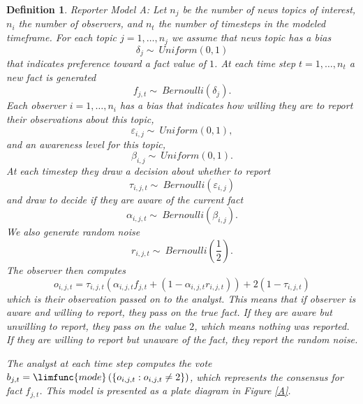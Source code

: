 \documentclass{amsart}
\theoremstyle{plain}
\newtheorem{definition}{Definition}
\numberwithin{equation}{section}
\begin{document}
\begin{definition}
Reporter Model A: Let $n_{j}$ be the number of news topics of interest, $%
n_{i}$ the number of observers, and $n_{t}$ the number of timesteps in the
modeled timeframe. For each topic $j=1,\dots ,n_{j}$ we assume that news
topic has a bias 
\begin{equation*}
\delta _{j}\sim ~Uniform\left( 0,1\right)
\end{equation*}%
that indicates preference toward a fact value of $1$. At each time step $%
t=1,\dots ,n_{t}$ a new fact is generated%
\begin{equation*}
f_{j,t}\sim ~Bernoulli\left( \delta _{j}\right) .
\end{equation*}%
Each observer $i=1,\dots ,n_{i}$ has a bias that indicates how willing they
are to report their observations about this topic,%
\begin{equation*}
\varepsilon _{i,j}\sim ~Uniform\left( 0,1\right) ,
\end{equation*}%
and an awareness level for this topic,%
\begin{equation*}
\beta _{i,j}\sim ~Uniform\left( 0,1\right) .
\end{equation*}%
At each timestep they draw a decision about whether to report%
\begin{equation*}
\tau _{i,j,t}\sim ~Bernoulli\left( \varepsilon _{i,j}\right)
\end{equation*}%
and draw to decide if they are aware of the current fact%
\begin{equation*}
\alpha _{i,j,t}\sim ~Bernoulli\left( \beta _{i,j}\right) .
\end{equation*}%
We also generate random noise 
\begin{equation*}
r_{i,j,t}\sim ~Bernoulli\left( \frac{1}{2}\right) .
\end{equation*}%
The observer then computes%
\begin{equation*}
o_{i,j,t}=\tau _{i,j,t}\left( \alpha _{i,j,t}f_{j,t}+\left( 1-\alpha
_{i,j,t}r_{i,j,t}\right) \right) +2\left( 1-\tau _{i,j,t}\right)
\end{equation*}%
which is their observation passed on to the analyst. This means that if
observer is aware and willing to report, they pass on the true fact. If they
are aware but unwilling to report, they pass on the value $2$, which means
nothing was reported. If they are willing to report but unaware of the fact,
they report the random noise.

The analyst at each time step computes the vote $b_{j,t}=\limfunc{mode}%
\left( \left\{ o_{i,j,t}:o_{i,j,t}\neq 2\right\} \right) $, which represents
the consensus for fact $f_{j,t}$. This model is presented as a plate diagram
in Figure \ref{A}.
\end{definition}
\end{document}
